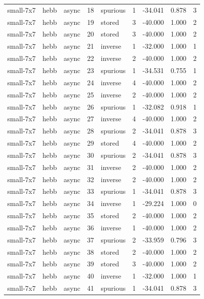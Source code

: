\begin{tabular}{lllrlrrrr}
small-7x7 & hebb & async & 18 & spurious & 1 & -34.041 & 0.878 & 3 \\
small-7x7 & hebb & async & 19 & stored & 3 & -40.000 & 1.000 & 2 \\
small-7x7 & hebb & async & 20 & stored & 3 & -40.000 & 1.000 & 2 \\
small-7x7 & hebb & async & 21 & inverse & 1 & -32.000 & 1.000 & 1 \\
small-7x7 & hebb & async & 22 & inverse & 2 & -40.000 & 1.000 & 2 \\
small-7x7 & hebb & async & 23 & spurious & 1 & -34.531 & 0.755 & 1 \\
small-7x7 & hebb & async & 24 & inverse & 4 & -40.000 & 1.000 & 2 \\
small-7x7 & hebb & async & 25 & inverse & 2 & -40.000 & 1.000 & 2 \\
small-7x7 & hebb & async & 26 & spurious & 1 & -32.082 & 0.918 & 1 \\
small-7x7 & hebb & async & 27 & inverse & 4 & -40.000 & 1.000 & 2 \\
small-7x7 & hebb & async & 28 & spurious & 2 & -34.041 & 0.878 & 3 \\
small-7x7 & hebb & async & 29 & stored & 4 & -40.000 & 1.000 & 2 \\
small-7x7 & hebb & async & 30 & spurious & 2 & -34.041 & 0.878 & 3 \\
small-7x7 & hebb & async & 31 & inverse & 2 & -40.000 & 1.000 & 2 \\
small-7x7 & hebb & async & 32 & inverse & 2 & -40.000 & 1.000 & 2 \\
small-7x7 & hebb & async & 33 & spurious & 1 & -34.041 & 0.878 & 3 \\
small-7x7 & hebb & async & 34 & inverse & 1 & -29.224 & 1.000 & 0 \\
small-7x7 & hebb & async & 35 & stored & 2 & -40.000 & 1.000 & 2 \\
small-7x7 & hebb & async & 36 & inverse & 1 & -40.000 & 1.000 & 2 \\
small-7x7 & hebb & async & 37 & spurious & 2 & -33.959 & 0.796 & 3 \\
small-7x7 & hebb & async & 38 & stored & 2 & -40.000 & 1.000 & 2 \\
small-7x7 & hebb & async & 39 & stored & 3 & -40.000 & 1.000 & 2 \\
small-7x7 & hebb & async & 40 & inverse & 1 & -32.000 & 1.000 & 1 \\
small-7x7 & hebb & async & 41 & spurious & 1 & -34.041 & 0.878 & 3 \\

\end{tabular}
